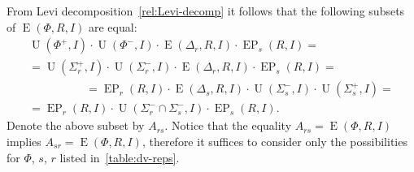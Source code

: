\documentclass[11pt]{amsart}
\theoremstyle{plain}
\numberwithin{equation}{section}
\numberwithin{lemma}{section}
\theoremstyle{definition}
\theoremstyle{remark}
\DeclareMathOperator{\E}{E}
\DeclareMathOperator{\EP}{EP}
\DeclareMathOperator{\U}{U}
\begin{document}
From Levi decomposition~\eqref{rel:Levi-decomp} it follows that the following subsets of $\E(\Phi, R, I)$ are equal:
\begin{multline*}
\U(\Phi^+, I)\cdot \U(\Phi^-, I) \cdot \E(\Delta_r, R, I) \cdot \EP_s(R, I) = \\
= \U(\Sigma_r^+, I)\cdot \U(\Sigma^-_r, I) \cdot \E(\Delta_r, R, I) \cdot \EP_s(R, I) = \hspace{5em} \\
\hspace{5em} = \EP_r(R, I) \cdot \E(\Delta_s, R, I) \cdot \U(\Sigma_s^-, I)\cdot \U(\Sigma_s^+, I) = \\
= \EP_r(R, I) \cdot \U(\Sigma^-_r \cap \Sigma^-_s, I) \cdot \EP_s(R, I).
\end{multline*}
Denote the above subset by $A_{rs}$. 
Notice that the equality $A_{rs} = \E(\Phi, R, I)$ implies $A_{sr} = \E(\Phi, R, I)$, 
 therefore it suffices to consider only the possibilities for $\Phi$, $s$, $r$ listed in~\cref{table:dv-reps}.
\end{document}
